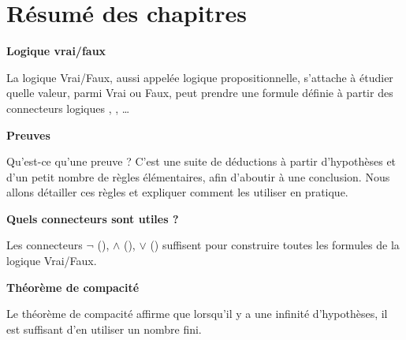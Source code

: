 

\cleardoublepage
\thispagestyle{empty}
\tableofcontents

\cleardoublepage
\section*{Résumé des chapitres}


\newcommand{\titrechapitre}[1]{{\textbf{#1}}\nopagebreak}
\newcommand{\descriptionchapitre}[1]{%
\smallskip\hfill
\begin{minipage}{0.95\textwidth}\small#1\end{minipage}\medskip\smallskip}





\titrechapitre{Logique vrai/faux}

\descriptionchapitre{La logique \og{}Vrai/Faux\fg{}, aussi appelée logique propositionnelle, s'attache à étudier quelle valeur, parmi \og{}Vrai\fg{} ou \og{}Faux\fg{}, peut prendre une formule définie à partir des connecteurs logiques \tand, \tor, \tnot\ldots}


\titrechapitre{Preuves}

\descriptionchapitre{Qu'est-ce qu'une preuve ? C'est une suite de déductions à partir d'hypothèses et d'un petit nombre de règles élémentaires, afin d'aboutir à une conclusion. Nous allons détailler ces règles et expliquer comment les utiliser en pratique.}


\titrechapitre{Quels connecteurs sont utiles ?}

\descriptionchapitre{Les connecteurs $\lnot$ (\tnot), $\land$ (\tand), $\lor$ (\tor) suffisent pour construire toutes les formules de la logique Vrai/Faux.}


\titrechapitre{Théorème de compacité}

\descriptionchapitre{Le théorème de compacité affirme que lorsqu'il y a une infinité d'hypothèses, il est suffisant d'en utiliser un nombre fini.

}


